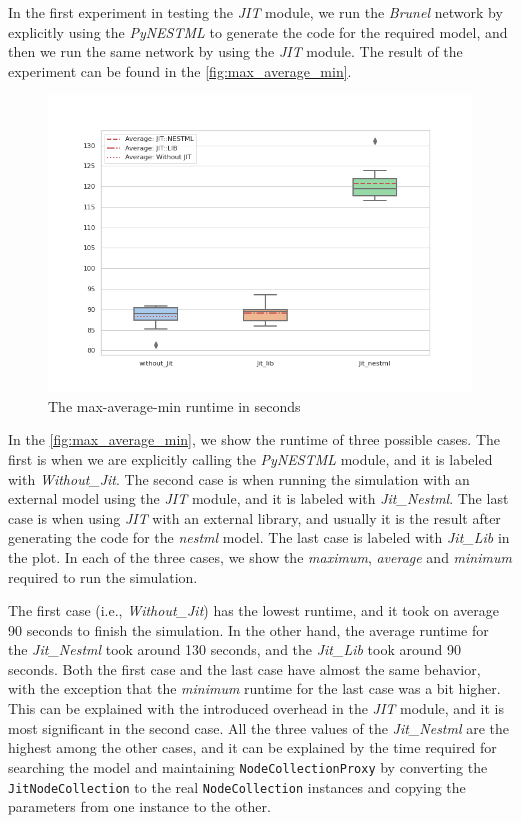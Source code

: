 In the first experiment in testing the \emph{JIT} module, we run the \emph{Brunel} network by explicitly using the \emph{PyNESTML} to generate the code for the required model, and then we run the same network by using the \emph{JIT} module. The result of the experiment can be found in the \autoref{fig:max_average_min}.

\begin{figure}[ht!]
    \centering
    \includegraphics[width=\textwidth]{src/pic/box_plot_three.png}
    \caption{The max-average-min runtime in seconds}
    \label{fig:max_average_min}
\end{figure}

In the \autoref{fig:max_average_min}, we show the runtime of three possible cases. The first is when we are explicitly calling the \emph{PyNESTML} module, and it is labeled with \emph{Without\_Jit}. The second case is when running the simulation with an external model using the \emph{JIT} module, and it is labeled with \emph{Jit\_Nestml}. The last case is when using \emph{JIT} with an external library, and usually it is the result after generating the code for the \emph{nestml} model. The last case is labeled with \emph{Jit\_Lib} in the plot. In each of the three cases, we show the \emph{maximum}, \emph{average} and \emph{minimum} required to run the simulation.

The first case (i.e., \emph{Without\_Jit}) has the lowest runtime, and it took on average 90 seconds to finish the simulation. In the other hand, the average runtime for the \emph{Jit\_Nestml} took around 130 seconds, and the \emph{Jit\_Lib} took around 90 seconds.  Both the first case and the last case have almost the same behavior, with the exception that the \emph{minimum} runtime for the last case was a bit higher. This can be explained with the introduced overhead in the \emph{JIT} module, and it is most significant in the second case. All the three values of the \emph{Jit\_Nestml} are the highest among the other cases, and it can be explained by the time required for searching the model and maintaining \texttt{NodeCollectionProxy} by converting the \texttt{JitNodeCollection} to the real \texttt{NodeCollection} instances and copying the parameters from one instance to the other.


